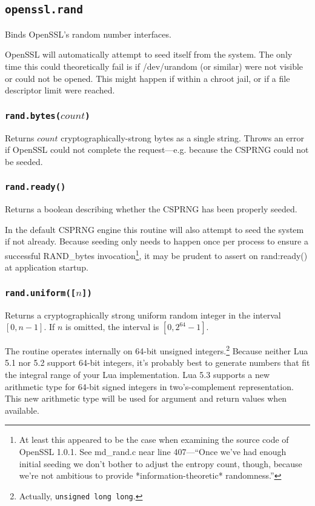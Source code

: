 \documentclass[11pt, oneside]{memoir}
\newcommand*{\fn}[1]{\texttt{#1}\xspace}
\newcounter{toccols}
\newenvironment{Module}[1]{
	\subsection{\texttt{#1}}
	\addtocontents{toc}{
		\protect\begin{multicols}{\value{toccols}}
	}
}{
	\addtocontents{toc}{\protect\end{multicols}}
}
\begin{document}
\begin{Module}{openssl.rand}

Binds OpenSSL's random number interfaces.

OpenSSL will automatically attempt to seed itself from the system. The only time this could theoretically fail is if /dev/urandom (or similar) were not visible or could not be opened. This might happen if within a chroot jail, or if a file descriptor limit were reached.

\subsubsection[\fn{rand.bytes}]{\fn{rand.bytes($count$)}}

Returns $count$ cryptographically-strong bytes as a single string. Throws an error if OpenSSL could  not complete the request---e.g. because the CSPRNG could not be seeded.

\subsubsection[\fn{rand.ready}]{\fn{rand.ready()}}

Returns a boolean describing whether the CSPRNG has been properly seeded.

In the default CSPRNG engine this routine will also attempt to seed the system if not already. Because seeding only needs to happen once per process to ensure a successful RAND\_bytes invocation\footnote{At least this appeared to be the case when examining the source code of OpenSSL 1.0.1. See md\_rand.c near line 407---``Once we've had enough initial seeding we don't bother to adjust the entropy count, though, because we're not ambitious to provide *information-theoretic* randomness.''}, it may be prudent to assert on rand:ready() at application startup.

\subsubsection[\fn{rand.uniform}]{\fn{rand.uniform([$n$])}}

Returns a cryptographically strong uniform random integer in the interval $[0, n-1]$. If $n$ is omitted, the interval is $[0, 2^{64}-1]$.

The routine operates internally on 64-bit unsigned integers.\footnote{Actually, \texttt{unsigned long long}.} Because neither Lua 5.1 nor 5.2 support 64-bit integers, it's probably best to generate numbers that fit the integral range of your Lua implementation. Lua 5.3 supports a new arithmetic type for 64-bit signed integers in two's-complement representation. This new arithmetic type will be used for argument and return values when available.

\end{Module}
\end{document}

